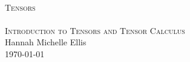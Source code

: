 \begin{titlepage}
\begin{center}
\HRule \\[0.5cm]
\textsc{\huge Tensors}\\[0.5cm]
\HRule \\[0.5cm]
\textsc{\Large Introduction to Tensors and Tensor Calculus}\\[0.5cm]
\vfill
Hannah Michelle Ellis\\[1.0cm]
\today
\end{center}
\end{titlepage}
